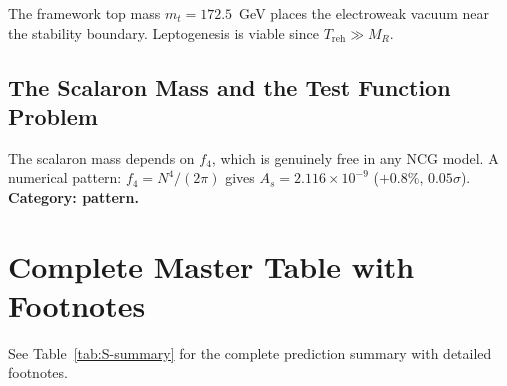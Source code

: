 \documentclass[12pt,a4paper]{article}
\theoremstyle{definition}
\begin{document}
The framework top mass $m_t = 172.5$~GeV places the electroweak vacuum near the stability boundary.  Leptogenesis is viable since $T_{\text{reh}} \gg M_R$.

\subsection{The Scalaron Mass and the Test Function Problem}

The scalaron mass depends on $f_4$, which is genuinely free in any NCG model.  A numerical pattern: $f_4 = N^4/(2\pi)$ gives $A_s = 2.116 \times 10^{-9}$ ($+0.8\%$, $0.05\sigma$).  \textbf{Category: pattern.}


\section{Complete Master Table with Footnotes}
\label{sec:S-master-table}

See Table~\ref{tab:S-summary} for the complete prediction summary with detailed footnotes.
\end{document}
